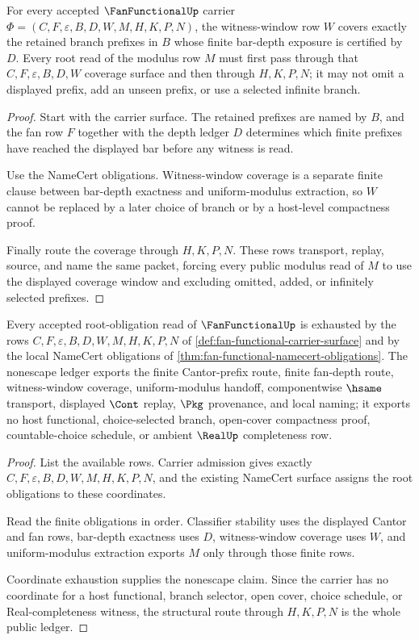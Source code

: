 \begin{theorem}
\label{thm:fan-functional-root-witness-window-coverage}
For every accepted $\FanFunctionalUp$ carrier $\Phi=(C,F,\varepsilon,B,D,W,M,H,K,P,N)$, the witness-window row $W$ covers exactly the retained branch prefixes in $B$ whose finite bar-depth exposure is certified by $D$. Every root read of the modulus row $M$ must first pass through that $C,F,\varepsilon,B,D,W$ coverage surface and then through $H,K,P,N$; it may not omit a displayed prefix, add an unseen prefix, or use a selected infinite branch.
\end{theorem}
\begin{proof}
Start with the carrier surface. The retained prefixes are named by $B$, and the fan row $F$ together with the depth ledger $D$ determines which finite prefixes have reached the displayed bar before any witness is read.

Use the NameCert obligations. Witness-window coverage is a separate finite clause between bar-depth exactness and uniform-modulus extraction, so $W$ cannot be replaced by a later choice of branch or by a host-level compactness proof.

Finally route the coverage through $H,K,P,N$. These rows transport, replay, source, and name the same packet, forcing every public modulus read of $M$ to use the displayed coverage window and excluding omitted, added, or infinitely selected prefixes.
\end{proof}

\begin{theorem}
\label{thm:fan-functional-root-nonescape-ledger}
Every accepted root-obligation read of $\FanFunctionalUp$ is exhausted by the rows $C,F,\varepsilon,B,D,W,M,H,K,P,N$ of \autoref{def:fan-functional-carrier-surface} and by the local NameCert obligations of \autoref{thm:fan-functional-namecert-obligations}. The nonescape ledger exports the finite Cantor-prefix route, finite fan-depth route, witness-window coverage, uniform-modulus handoff, componentwise $\hsame$ transport, displayed $\Cont$ replay, $\Pkg$ provenance, and local naming; it exports no host functional, choice-selected branch, open-cover compactness proof, countable-choice schedule, or ambient $\RealUp$ completeness row.
\end{theorem}
\begin{proof}
List the available rows. Carrier admission gives exactly $C,F,\varepsilon,B,D,W,M,H,K,P,N$, and the existing NameCert surface assigns the root obligations to these coordinates.

Read the finite obligations in order. Classifier stability uses the displayed Cantor and fan rows, bar-depth exactness uses $D$, witness-window coverage uses $W$, and uniform-modulus extraction exports $M$ only through those finite rows.

Coordinate exhaustion supplies the nonescape claim. Since the carrier has no coordinate for a host functional, branch selector, open cover, choice schedule, or Real-completeness witness, the structural route through $H,K,P,N$ is the whole public ledger.
\end{proof}
